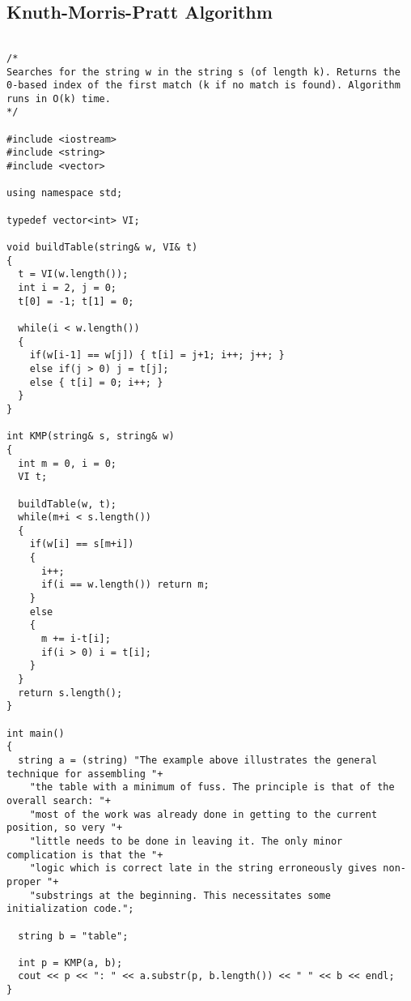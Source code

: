 \subsection{Knuth-Morris-Pratt Algorithm}
\begin{lstlisting}

/*
Searches for the string w in the string s (of length k). Returns the
0-based index of the first match (k if no match is found). Algorithm
runs in O(k) time.
*/

#include <iostream>
#include <string>
#include <vector>

using namespace std;

typedef vector<int> VI;

void buildTable(string& w, VI& t)
{
  t = VI(w.length());  
  int i = 2, j = 0;
  t[0] = -1; t[1] = 0;
  
  while(i < w.length())
  {
    if(w[i-1] == w[j]) { t[i] = j+1; i++; j++; }
    else if(j > 0) j = t[j];
    else { t[i] = 0; i++; }
  }
}

int KMP(string& s, string& w)
{
  int m = 0, i = 0;
  VI t;
  
  buildTable(w, t);  
  while(m+i < s.length())
  {
    if(w[i] == s[m+i])
    {
      i++;
      if(i == w.length()) return m;
    }
    else
    {
      m += i-t[i];
      if(i > 0) i = t[i];
    }
  }  
  return s.length();
}

int main()
{
  string a = (string) "The example above illustrates the general technique for assembling "+
    "the table with a minimum of fuss. The principle is that of the overall search: "+
    "most of the work was already done in getting to the current position, so very "+
    "little needs to be done in leaving it. The only minor complication is that the "+
    "logic which is correct late in the string erroneously gives non-proper "+
    "substrings at the beginning. This necessitates some initialization code.";
  
  string b = "table";
  
  int p = KMP(a, b);
  cout << p << ": " << a.substr(p, b.length()) << " " << b << endl;
}

\end{lstlisting}